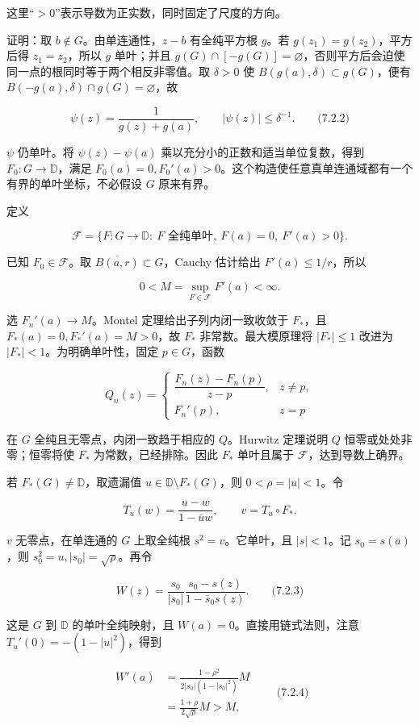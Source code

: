 \documentclass[11pt,a4paper]{article}
\begin{document}
这里``\(>0\)''表示导数为正实数，同时固定了尺度的方向。

证明：取 \(b\notin G\)。由单连通性，\(z-b\) 有全纯平方根 \(g\)。若
\(g(z_1)=g(z_2)\)，平方后得 \(z_1=z_2\)，所以 \(g\) 单叶；并且
\(g(G)\cap[-g(G)]=\varnothing\)，否则平方后会迫使同一点的根同时等于两个相反非零值。取
\(\delta>0\) 使 \(B(g(a),\delta)\subset g(G)\)，便有
\(B(-g(a),\delta)\cap g(G)=\varnothing\)，故

\[
\psi(z)=\frac1{g(z)+g(a)},\qquad |\psi(z)|\le\delta^{-1}.
\qquad\text{(7.2.2)}
\]

\(\psi\) 仍单叶。将 \(\psi(z)-\psi(a)\)
乘以充分小的正数和适当单位复数，得到 \(F_0:G\to\mathbb D\)，满足
\(F_0(a)=0,F_0'(a)>0\)。这个构造使任意真单连通域都有一个有界的单叶坐标，不必假设
\(G\) 原来有界。

定义

\[
\mathcal F=\{F:G\to\mathbb D:\ F\text{ 全纯单叶},\ F(a)=0,\ F'(a)>0\}.
\]

已知 \(F_0\in\mathcal F\)。取 \(\overline{B(a,r)}\subset G\)，Cauchy
估计给出 \(F'(a)\le1/r\)，所以

\[
0<M=\sup_{F\in\mathcal F}F'(a)<\infty.
\]

选 \(F_n'(a)\to M\)。Montel 定理给出子列内闭一致收敛于 \(F_*\)，且
\(F_*(a)=0,F_*'(a)=M>0\)，故 \(F_*\) 非常数。最大模原理将 \(|F_*|\le1\)
改进为 \(|F_*|<1\)。为明确单叶性，固定 \(p\in G\)，函数

\[
Q_n(z)=\begin{cases}\dfrac{F_n(z)-F_n(p)}{z-p},&z\ne p,\\F_n'(p),&z=p\end{cases}
\]

在 \(G\) 全纯且无零点，内闭一致趋于相应的 \(Q\)。Hurwitz 定理说明 \(Q\)
恒零或处处非零；恒零将使 \(F_*\) 为常数，已经排除。因此 \(F_*\)
单叶且属于 \(\mathcal F\)，达到导数上确界。

若 \(F_*(G)\ne\mathbb D\)，取遗漏值
\(u\in\mathbb D\setminus F_*(G)\)，则 \(0<\rho=|u|<1\)。令

\[
T_u(w)=\frac{u-w}{1-\bar u w},\qquad v=T_u\circ F_*.
\]

\(v\) 无零点，在单连通的 \(G\) 上取全纯根 \(s^2=v\)。它单叶，且
\(|s|<1\)。记 \(s_0=s(a)\)，则 \(s_0^2=u,|s_0|=\sqrt\rho\)。再令

\[
W(z)=\frac{s_0}{|s_0|}\frac{s_0-s(z)}{1-\bar s_0s(z)}.
\qquad\text{(7.2.3)}
\]

这是 \(G\) 到 \(\mathbb D\) 的单叶全纯映射，且
\(W(a)=0\)。直接用链式法则，注意 \(T_u'(0)=-(1-|u|^2)\)，得到

\[
\begin{aligned}
W'(a)&=\frac{1-\rho^2}{2|s_0|(1-|s_0|^2)}M\\
&=\frac{1+\rho}{2\sqrt\rho}M>M,
\end{aligned}\qquad\text{(7.2.4)}
\]
\end{document}
